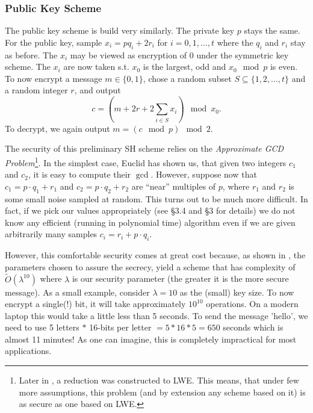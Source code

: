 \subsubsection*{Public Key Scheme}
The public key scheme is build very similarly. The private key $p$ stays the same. For the public key, sample $x_i = p q_i + 2r_i$ for $i = 0, 1, \dots, t$ where the $q_i$ and $r_i$ stay as before. The $x_i$ may be viewed as encryption of 0 under the symmetric key scheme. The $x_i$ are now taken s.t. $x_0$ is the largest, odd and $x_0 \mod p$ is even.\\
To now encrypt a message $m \in \{0,1\}$, chose a random subset $S \subseteq \{1, 2, \dots, t\}$ and a random integer $r$, and output
\begin{equation} c = (m + 2r + 2\sum_{i \in S} x_i) \mod x_0.\end{equation}
To decrypt, we again output $m = (c \mod p) \mod 2$.

The security of this preliminary SH scheme relies on the \textit{Approximate GCD Problem}\footnote{Later in \cite{revisited}, a reduction was constructed to LWE. This means, that under few more assumptions, this problem (and by extension any scheme based on it) is as secure as one based on LWE.}. In the simplest case, Euclid has shown us, that given two integers $c_1$ and $c_2$, it is easy to compute their $\gcd$. However, suppose now that $c_1 = p \cdot q_1 + r_1$ and $c_2 = p \cdot q_2 + r_2$ are ``near'' multiples of $p$, where $r_1$ and $r_2$ is some small noise sampled at random. This turns out to be much more difficult. In fact, if we pick our values appropriately (see \cite{easy_fhe} \S 3.4 and \cite{int_scheme} \S 3 for details) we do not know any efficient (running in polynomial time) algorithm even if we are given arbitrarily many samples $c_i = r_i + p \cdot q_i$.

However, this comfortable security comes at great cost because, as shown in \cite{int_scheme}, the parameters chosen to assure the secrecy, yield a scheme that has complexity of $\tilde{O}(\lambda^{10})$ where $\lambda$ is our security parameter (the greater it is the more secure message). As a small example, consider $\lambda = 10$ as the (small) key size. To now encrypt a single(!) bit, it will take approximately $10^{10}$ operations. On a modern laptop this would take a little less than 5 seconds. To send the message 'hello', we need to use 5 letters $*$ 16-bits per letter $= 5*16*5 = 650$ seconds which is almost 11 minutes! As one can imagine, this is completely impractical for most applications.

